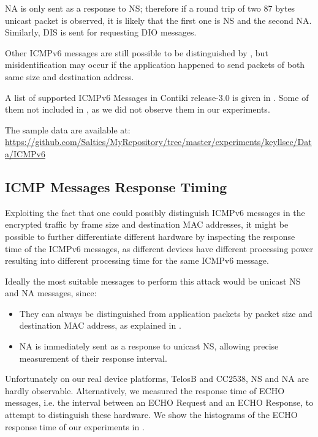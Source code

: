 NA is only sent as a response to NS; therefore if a round trip of two 87 bytes unicast packet is observed, it is likely that the first one is NS and the second NA. Similarly, DIS is sent for requesting DIO messages.  

Other ICMPv6 messages are still possible to be distinguished by , but misidentification may occur if the application happened to send packets of both same size and destination address.

A list of supported ICMPv6 Messages in Contiki release-3.0 is given in . Some of them not included in , as we did not observe them in our experiments.

The sample data are available at:\\
\url{https://github.com/Salties/MyRepository/tree/master/experiments/keyllsec/Data/ICMPv6}

\subsection{ICMP Messages Response Timing}

Exploiting the fact that one could possibly distinguish ICMPv6 messages in the encrypted traffic by frame size and destination MAC addresses, it might be possible to further differentiate different hardware by inspecting the response time of the ICMPv6 messages, as different devices have different processing power resulting into different processing time for the same ICMPv6 message.

Ideally the most suitable messages to perform this attack would be unicast NS and NA messages, since:
\begin{itemize}
	\item They can always be distinguished from application packets by packet size and destination MAC address, as explained in .
	\item NA is immediately sent as a response to unicast NS, allowing precise measurement of their response interval.
\end{itemize}

Unfortunately on our real device platforms, TelosB and CC2538, NS and NA are hardly observable. Alternatively, we measured the response time of ECHO messages, i.e. the interval between an ECHO Request and an ECHO Response, to attempt to distinguish these hardware.  We show the histograms of the ECHO response time of our experiments in .

